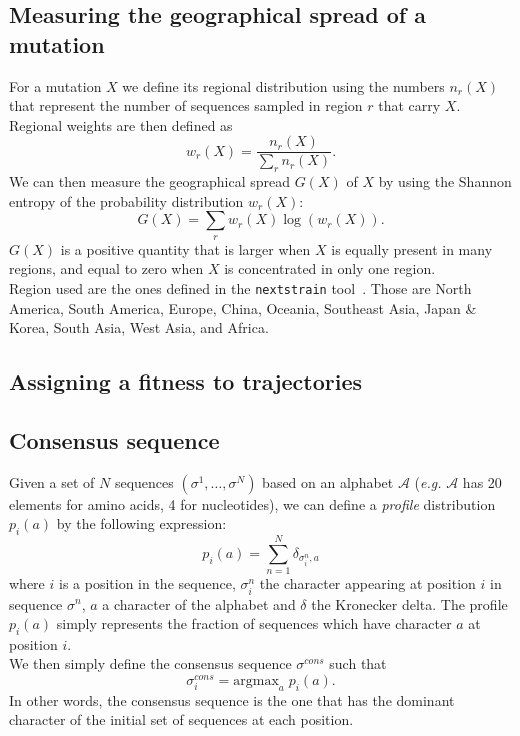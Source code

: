 \documentclass[reprint,amsmath,amssymb,superscriptaddress,showpacs,pre]{revtex4-1}
\begin{document}
\subsection*{Measuring the geographical spread of a mutation} %
\label{sub:measuring_the_geographical_spread_of_a_mutation}
	For a mutation $X$ we define its regional distribution using the numbers $n_r(X)$ that represent the number of sequences sampled in region $r$ that carry $X$. Regional weights are then defined as 
	$$ w_r(X) = \frac{n_r(X)}{\sum_{r}n_r(X)}.$$
	We can then measure the geographical spread $G(X)$ of $X$ by using the Shannon entropy of the probability distribution $w_r(X)$: 
	$$G(X) = \sum_r w_r(X)\log(w_r(X)).$$
	$G(X)$ is a positive quantity that is larger when $X$ is equally present in many regions, and equal to zero when $X$ is concentrated in only one region.\\
	Region used are the ones defined in the \texttt{nextstrain} tool~\cite{10.1093/bioinformatics/bty407}. Those are {North America}, {South America}, {Europe}, {China}, {Oceania}, {Southeast Asia}, {Japan \& Korea}, {South Asia}, {West Asia}, and {Africa}.

\subsection*{Assigning a fitness to trajectories} %
\label{sub:assigning_a_fitness_to_trajectories}


\subsection*{Consensus sequence} %
\label{sub:consensus_sequence}
	Given a set of $N$ sequences $(\sigma^1,\ldots,\sigma^N)$ based on an alphabet $\mathcal{A}$ (\emph{e.g.} $\mathcal{A}$ has 20 elements for amino acids, 4 for nucleotides), we can define a \emph{profile} distribution $p_i(a)$ by the following expression:
	$$ p_i(a) = \sum_{n=1}^N \delta_{\sigma^n_i,a} $$ 
	where $i$ is a position in the sequence, $\sigma^n_i$ the character appearing at position $i$ in sequence $\sigma^n$, $a$ a character of the alphabet and $\delta$ the Kronecker delta. The profile $p_i(a)$ simply represents the fraction of sequences which have character $a$ at position $i$. \\
	We then simply define the consensus sequence $\sigma^{cons}$ such that 
	$$\sigma^{cons}_i = \text{argmax}_a \;p_i(a).$$
	In other words, the consensus sequence is the one that has the dominant character of the initial set of sequences at each position.   
\end{document}
